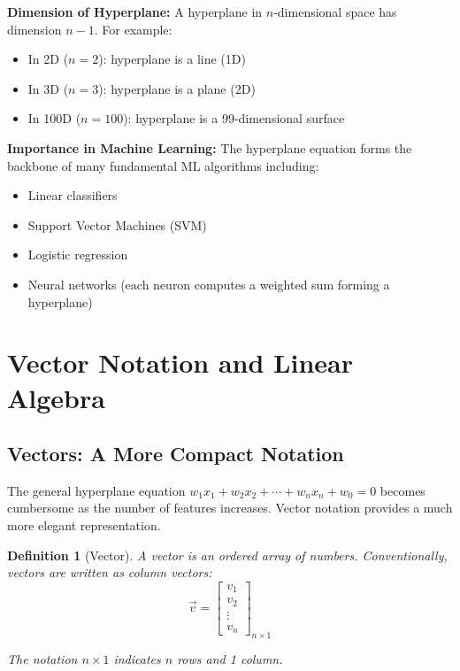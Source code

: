 \documentclass[12pt,a4paper]{article}
\theoremstyle{directpoint}
\newtheorem*{definition}{Definition}
\theoremstyle{definition}
\begin{document}
\textbf{Dimension of Hyperplane:} A hyperplane in $n$-dimensional space has dimension $n-1$. For example:
\begin{itemize}
    \item In 2D ($n=2$): hyperplane is a line (1D)
    \item In 3D ($n=3$): hyperplane is a plane (2D)
    \item In 100D ($n=100$): hyperplane is a 99-dimensional surface
\end{itemize}

\textbf{Importance in Machine Learning:} The hyperplane equation forms the backbone of many fundamental ML algorithms including:
\begin{itemize}
    \item Linear classifiers
    \item Support Vector Machines (SVM)
    \item Logistic regression
    \item Neural networks (each neuron computes a weighted sum forming a hyperplane)
\end{itemize}

\newpage

\section{Vector Notation and Linear Algebra}

\subsection{Vectors: A More Compact Notation}

The general hyperplane equation $w_1x_1 + w_2x_2 + \cdots + w_nx_n + w_0 = 0$ becomes cumbersome as the number of features increases. Vector notation provides a much more elegant representation.

\begin{definition}[Vector]
A vector is an ordered array of numbers. Conventionally, vectors are written as column vectors:
\begin{equation}
\vec{v} = \begin{bmatrix}
v_1 \\
v_2 \\
\vdots \\
v_n
\end{bmatrix}_{n \times 1}
\end{equation}

The notation $n \times 1$ indicates $n$ rows and 1 column.
\end{definition}
\end{document}
